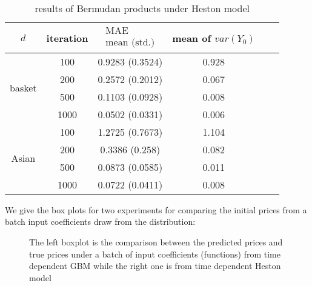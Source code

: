 \documentclass[11pt,a4paper]{article}
\theoremstyle{remark}
\begin{document}
	\begin{table}[H]
		\centering
		\begin{tabular}{cccccc}
			\hline$d$ & iteration & $\begin{array}{c}\text{MAE} \\
				\text{mean (std.)} \end{array}$   & mean of $var(Y_0)$  \\
			\hline \multirow{4}{*}{basket} & 100 & 0.9283 (0.3524) & 0.928 \\
			& 200 & 0.2572 (0.2012) & 0.067 \\
			& 500 & 0.1103 (0.0928) & 0.008 \\
			& 1000 & 0.0502 (0.0331) & 0.006 \\
			
			\hline \multirow{4}{*}{Asian} & 100 & 1.2725 (0.7673) & 1.104 \\
			& 200 & 0.3386 (0.258) & 0.082 \\
			& 500 & 0.0873 (0.0585) & 0.011 \\
			& 1000 & 0.0722 (0.0411) & 0.008 \\
			
			\hline
		\end{tabular}
		\caption{results of Bermudan products under Heston model}
		\label{tab:my_label}
	\end{table}
	\noindent We give the box plots for two experiments for comparing the initial prices from a batch input coefficients draw from the distribution:
	\begin{figure}[h!]
		\centering
		\quad
		\caption{The left boxplot is the comparison between the predicted prices and true prices under a batch of input coefficients (functions) from time dependent GBM while the right one is from time dependent Heston model}
		\label{fig:path}
	\end{figure}
\end{document}
